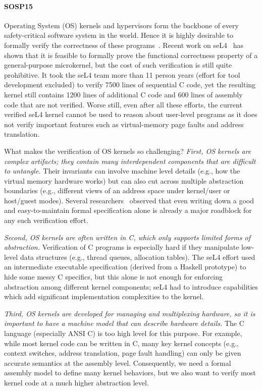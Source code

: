 {\paragraph{SOSP15}

Operating System (OS) kernels and hypervisors form the backbone of
every safety-critical software system in the world.  Hence it is highly
desirable to formally verify the correctness of these
programs~\cite{shao10}.  
Recent work on seL4~\cite{klein2009sel4,klein14} has shown that it is
feasible to formally prove the functional correctness property of a
general-purpose microkernel, but the cost of such verification is
still quite prohibitive. It took the seL4 team more than 11 person
years (effort for tool development excluded) to verify 7500 lines of
sequential C code, yet the resulting kernel still contains 1200 lines
of additional C code and 600 lines of assembly code that are not
verified. Worse still, even after all these efforts, the current
verified seL4 kernel cannot be used to reason about user-level
programs as it does not verify important features such as
virtual-memory page faults and address translation.

What makes the verification of OS kernels so challenging?
{\em First, OS kernels are complex artifacts; they contain many
  interdependent components that are difficult to untangle.} Their
invariants can involve machine level details (e.g., how the virtual
memory hardware works) but can also cut across multiple
abstraction boundaries (e.g., different views of an address space
under kernel/user or host/guest modes).  Several
researchers~\cite{baumann12,vaynberg12} observed that even writing
down a good and easy-to-maintain formal specification alone is already
a major roadblock for any such verification effort.

{\em Second, OS kernels are often written in C, which only supports
  limited forms of abstraction.}  Verification of C programs is
especially hard if they manipulate low-level data structures (e.g.,
thread queues, allocation tables).  The seL4 effort used an
intermediate executable specification (derived from a Haskell
prototype) to hide some messy C specifics, but this alone is not
enough for enforcing abstraction among different kernel components;
seL4 had to introduce capabilities which add significant
implementation complexities to the kernel.

{\em Third, OS kernels are developed for managing and multiplexing
  hardware, so it is important to have a machine model that can
  describe hardware details.} The C language (especially ANSI C) is
too high level for this purpose. For example, while most kernel code
can be written in C, many key kernel concepts (e.g., context switches,
address translation, page fault handling) can only be given accurate
semantics at the assembly level. Consequently, we need a formal
assembly model to define many kernel behaviors, but we also want to
verify most kernel code at a much higher abstraction level.

}
